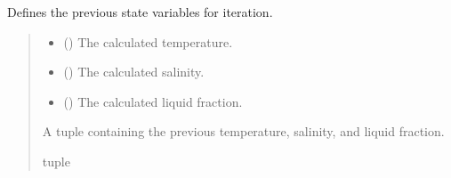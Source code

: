 \documentclass[a4paper,11pt,english,openany]{sphinxmanual}
\begin{document}
\begin{fulllineitems}
\label{\detokenize{api/spyice.statevariables:spyice.statevariables.define_previous_statevariable}}
\pysigstartsignatures
{}
\pysigstopsignatures
\sphinxAtStartPar
Defines the previous state variables for iteration.
\begin{quote}\begin{description}
\begin{itemize}
\item {} 
\sphinxAtStartPar
{} () \textendash{} The calculated temperature.

\item {} 
\sphinxAtStartPar
{} () \textendash{} The calculated salinity.

\item {} 
\sphinxAtStartPar
{} () \textendash{} The calculated liquid fraction.

\end{itemize}

\sphinxAtStartPar
A tuple containing the previous temperature, salinity, and liquid fraction.

\sphinxAtStartPar
tuple

\end{description}\end{quote}

\end{fulllineitems}

\end{document}
